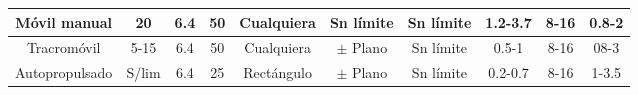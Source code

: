 \begin{table}[h!]
\begin{turn}{90}
\begin{tabular}{c|c|c|c|c|c|c|c|c|c}
			\multicolumn{1}{|c|}{Móvil manual}                                               & \multicolumn{1}{|c|}{20}                                                                  & \multicolumn{1}{|c|}{6.4}                                                              & \multicolumn{1}{|c|}{50} & \multicolumn{1}{c|}{Cualquiera}                                                  & \multicolumn{1}{c|}{Sn límite}                                                      & \multicolumn{1}{|c|}{Sn límite}                                                        & \multicolumn{1}{|c|}{1.2-3.7}                                                      & \multicolumn{1}{|c|}{8-16}                                                        & \multicolumn{1}{|c|}{0.8-2}                                                               \\ \midrule
			\multicolumn{1}{|c|}{Tracromóvil}                                                & \multicolumn{1}{|c|}{5-15}                                                                & \multicolumn{1}{|c|}{6.4}                                                              & \multicolumn{1}{|c|}{50} & \multicolumn{1}{c|}{Cualquiera}                                                  & \multicolumn{1}{c|}{$\pm$ Plano}                                                    & \multicolumn{1}{|c|}{Sn límite}                                                        & \multicolumn{1}{|c|}{0.5-1}                                                        & \multicolumn{1}{|c|}{8-16}                                                        & \multicolumn{1}{|c|}{08-3}                                                                \\ \midrule
			\multicolumn{1}{|c|}{Autopropulsado}                                             & \multicolumn{1}{|c|}{S/lim}                                                               & \multicolumn{1}{|c|}{6.4}                                                              & \multicolumn{1}{|c|}{25} & \multicolumn{1}{c|}{Rectángulo}                                                  & \multicolumn{1}{c|}{$\pm$ Plano}                                                    & \multicolumn{1}{|c|}{Sn límite}                                                        & \multicolumn{1}{|c|}{0.2-0.7}                                                      & \multicolumn{1}{|c|}{8-16}                                                        & \multicolumn{1}{|c|}{1-3.5}                                                               \\ \midrule

\end{tabular}
\end{turn}
\end{table}

